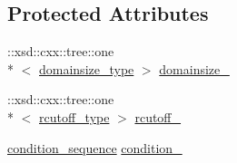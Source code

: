 \subsection*{Protected Attributes}
\begin{DoxyCompactItemize}
\item 
\-::xsd\-::cxx\-::tree\-::one\\*
$<$ \hyperlink{classlc__t_a14e4ab30758da00bc9f186b0ef06a97e}{domainsize\-\_\-type} $>$ \hyperlink{classlc__t_a55f74434096a0a3a65a7b6e1cc7896e1}{domainsize\-\_\-}
\item 
\-::xsd\-::cxx\-::tree\-::one\\*
$<$ \hyperlink{classlc__t_aeee50e2ac6fe42996cb39a92ad78883e}{rcutoff\-\_\-type} $>$ \hyperlink{classlc__t_a55af0ea7d58424b078f479cfa7465205}{rcutoff\-\_\-}
\item 
\hyperlink{classlc__t_a0ee6b40c23baf2237388873de0c9df3f}{condition\-\_\-sequence} \hyperlink{classlc__t_a8f977c09da602f2414c759e261795ba8}{condition\-\_\-}
\end{DoxyCompactItemize}


